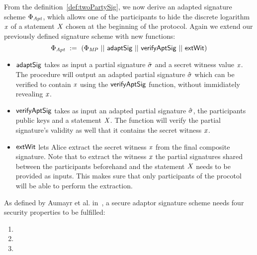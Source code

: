 \begin{definition}
    \label{def:twoPartyFixedWitAptSig}
    From the definition~\ref{def:twoPartySig}, we now derive an adapted signature scheme $\Phi_{\mathit{Apt}}$, which allows one of the participants to hide the discrete logarithm $\mathit{x}$ of a statement $\mathit{X}$ chosen
    at the beginning of the protocol. Again we extend our previously defined signature scheme with new functions:
    \[ \Phi_{\mathit{Apt}} ~:=~ (\Phi_{\mathit{MP}} ~||~ \mathsf{adaptSig} ~||~ \mathsf{verifyAptSig} ~||~ \mathsf{extWit}) \]
    
    \begin{itemize}
        \item $\mathsf{adaptSig}$ takes as input a partial signature $\tilde{\sigma}$ and a secret witness value $\mathit{x}$. The procedure will output an adapted partial signature $\hat{\sigma}$ which can be verified to contain $\mathit{x}$ using the $\mathsf{verifyAptSig}$ function, without immidiately revealing $\mathit{x}$.
        \item $\mathsf{verifyAptSig}$ takes as input an adapted partial signature $\hat{\sigma}$, the participants public keys and a statement $\mathit{X}$. The function will verify the partial signature's validity as well that it contains the secret witness $\mathit{x}$.
        \item $\mathsf{extWit}$ lets Alice extract the secret witness $\mathit{x}$ from the final composite signature. Note that to extract the witness $\mathit{x}$ the partial signatures shared between the participants beforehand and the statement $\mathit{X}$ needs to be provided as inputs. This makes sure that only participants of the procotol will be able to perform the extraction.
    \end{itemize}
\end{definition}

\begin{definition}
    As defined by Aumayr et al. in~\cite{aumayr2020bitcoinchannels}, a secure adaptor signature scheme needs four security properties to be fulfilled:
    \begin{enumerate}
        \item \cnstAptSigCorrectness
        \item \cnstaEUFCMA
        \item \cnstWitnessExtractability
    \end{enumerate}
\end{definition}


